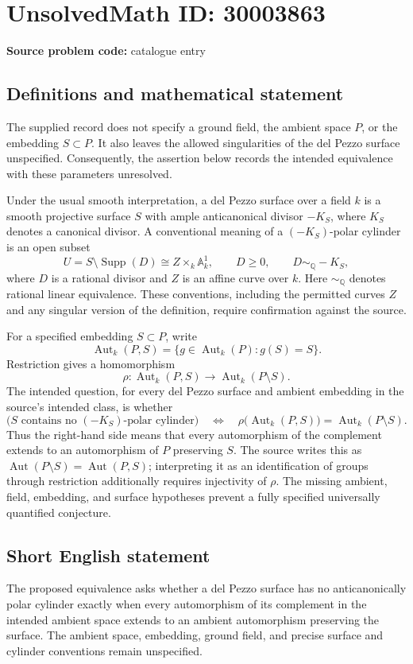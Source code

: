 \documentclass[11pt]{article}
\begin{document}
\section*{UnsolvedMath ID: 30003863}
\textbf{Source problem code:} catalogue entry
\subsection{Definitions and mathematical statement}
The supplied record does not specify a ground field, the ambient space \(P\), or the embedding \(S\subset P\). It also leaves the allowed singularities of the del Pezzo surface unspecified. Consequently, the assertion below records the intended equivalence with these parameters unresolved.

Under the usual smooth interpretation, a del Pezzo surface over a field \(k\) is a smooth projective surface \(S\) with ample anticanonical divisor \(-K_S\), where \(K_S\) denotes a canonical divisor. A conventional meaning of a \((-K_S)\)-polar cylinder is an open subset
\[
U=S\setminus\operatorname{Supp}(D)\cong Z\times_k\mathbb A^1_k,
\qquad D\geq 0,\qquad D\sim_{\mathbb Q}-K_S,
\]
where \(D\) is a rational divisor and \(Z\) is an affine curve over \(k\). Here \(\sim_{\mathbb Q}\) denotes rational linear equivalence. These conventions, including the permitted curves \(Z\) and any singular version of the definition, require confirmation against the source.

For a specified embedding \(S\subset P\), write
\[
\operatorname{Aut}_k(P,S)=\{g\in\operatorname{Aut}_k(P):g(S)=S\}.
\]
Restriction gives a homomorphism
\[
\rho:\operatorname{Aut}_k(P,S)\longrightarrow\operatorname{Aut}_k(P\setminus S).
\]
The intended question, for every del Pezzo surface and ambient embedding in the source's intended class, is whether
\[
\bigl(S\text{ contains no }(-K_S)\text{-polar cylinder}\bigr)
\quad\Longleftrightarrow\quad
\rho\bigl(\operatorname{Aut}_k(P,S)\bigr)=\operatorname{Aut}_k(P\setminus S).
\]
Thus the right-hand side means that every automorphism of the complement extends to an automorphism of \(P\) preserving \(S\). The source writes this as \(\operatorname{Aut}(P\setminus S)=\operatorname{Aut}(P,S)\); interpreting it as an identification of groups through restriction additionally requires injectivity of \(\rho\). The missing ambient, field, embedding, and surface hypotheses prevent a fully specified universally quantified conjecture.
\subsection{Short English statement}
The proposed equivalence asks whether a del Pezzo surface has no anticanonically polar cylinder exactly when every automorphism of its complement in the intended ambient space extends to an ambient automorphism preserving the surface. The ambient space, embedding, ground field, and precise surface and cylinder conventions remain unspecified.
\end{document}
